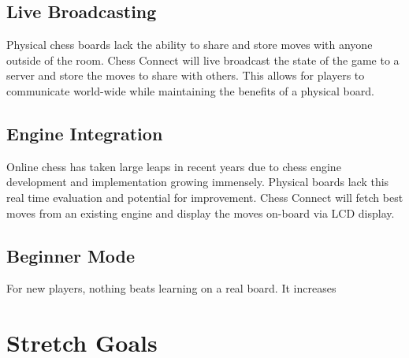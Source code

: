 \documentclass{article}
\begin{document}
\subsection{Live Broadcasting}
{Physical chess boards lack the ability to share and store moves with anyone outside of the room. Chess Connect will live broadcast the state of the game to a server and store the moves to share with others. This allows for players to communicate world-wide while maintaining the benefits of a physical board.} 
\subsection{Engine Integration}
{Online chess has taken large leaps in recent years due to chess engine development and implementation growing immensely. Physical boards lack this real time evaluation and potential for improvement. Chess Connect will fetch best moves from an existing engine and display the moves on-board via LCD display.}
\subsection{Beginner Mode}
{For new players, nothing beats learning on a real board. It increases }

\section{Stretch Goals}
\end{document}
